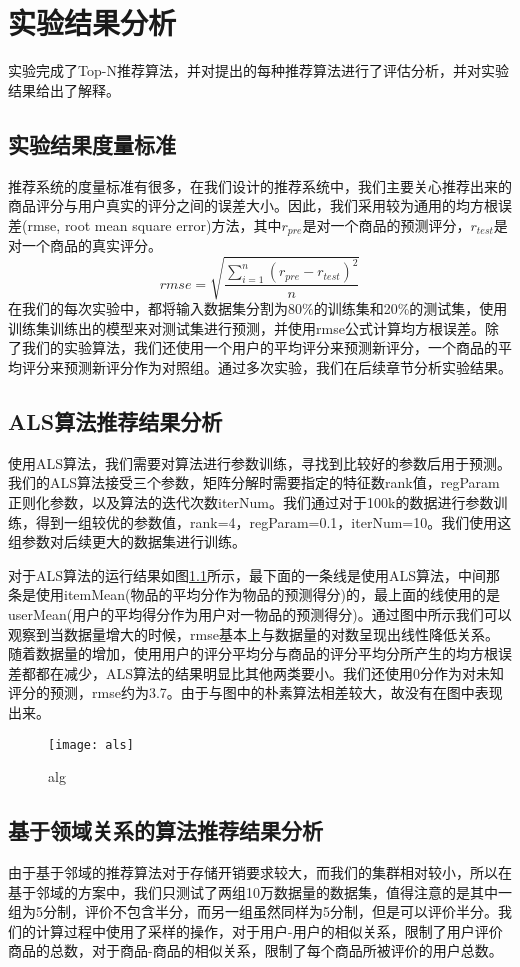 \chapter{实验结果分析}
实验完成了Top-N推荐算法，并对提出的每种推荐算法进行了评估分析，并对实验结果给出了解释。

\section{实验结果度量标准}
推荐系统的度量标准有很多，在我们设计的推荐系统中，我们主要关心推荐出来的商品评分与用户真实的评分之间的误差大小。因此，我们采用较为通用的均方根误差(rmse, root mean square error)方法，其中$r_{pre}$是对一个商品的预测评分，$r_{test}$是对一个商品的真实评分。
\begin{equation}
rmse = \sqrt{\frac{\sum_{i=1}^{n}(r_{pre} - r_{test})^2}{n}}
\end{equation}
在我们的每次实验中，都将输入数据集分割为80\%的训练集和20\%的测试集，使用训练集训练出的模型来对测试集进行预测，并使用rmse公式计算均方根误差。除了我们的实验算法，我们还使用一个用户的平均评分来预测新评分，一个商品的平均评分来预测新评分作为对照组。通过多次实验，我们在后续章节分析实验结果。
\section{ALS算法推荐结果分析}
使用ALS算法，我们需要对算法进行参数训练，寻找到比较好的参数后用于预测。我们的ALS算法接受三个参数，矩阵分解时需要指定的特征数rank值，regParam正则化参数，以及算法的迭代次数iterNum。我们通过对于100k的数据进行参数训练，得到一组较优的参数值，rank=4，regParam=0.1，iterNum=10。我们使用这组参数对后续更大的数据集进行训练。

对于ALS算法的运行结果如图\ref{fig:als}所示，最下面的一条线是使用ALS算法，中间那条是使用itemMean(物品的平均分作为物品的预测得分)的，最上面的线使用的是userMean(用户的平均得分作为用户对一物品的预测得分)。通过图中所示我们可以观察到当数据量增大的时候，rmse基本上与数据量的对数呈现出线性降低关系。随着数据量的增加，使用用户的评分平均分与商品的评分平均分所产生的均方根误差都都在减少，ALS算法的结果明显比其他两类要小。我们还使用0分作为对未知评分的预测，rmse约为3.7。由于与图中的朴素算法相差较大，故没有在图中表现出来。
\begin{figure}[ht]
\centering
\texttt{[image: als]}
\caption{alg}\label{fig:als}
\end{figure}

\section{基于领域关系的算法推荐结果分析}
由于基于邻域的推荐算法对于存储开销要求较大，而我们的集群相对较小，所以在基于邻域的方案中，我们只测试了两组10万数据量的数据集，值得注意的是其中一组为5分制，评价不包含半分，而另一组虽然同样为5分制，但是可以评价半分。我们的计算过程中使用了采样的操作，对于用户-用户的相似关系，限制了用户评价商品的总数，对于商品-商品的相似关系，限制了每个商品所被评价的用户总数。

